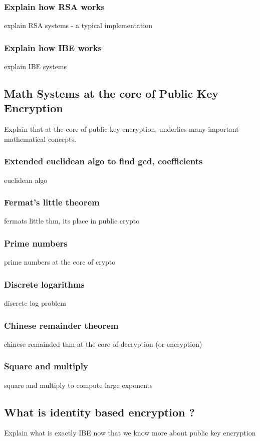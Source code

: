 \documentclass[conference]{IEEEtran}
\begin{document}
\subsubsection{Explain how RSA works}
explain RSA systems - a typical implementation

\subsubsection{Explain how IBE works}
explain IBE systems

\subsection{Math Systems at the core of Public Key Encryption}
Explain that at the core of public key encryption, underlies
many important mathematical concepts.

\subsubsection{Extended euclidean algo to find gcd, coefficients}
euclidean algo

\subsubsection{Fermat's little theorem}
fermats little thm, its place in public crypto

\subsubsection{Prime numbers}
prime numbers at the core of crypto

\subsubsection{Discrete logarithms}
discrete log problem

\subsubsection{Chinese remainder theorem}
chinese remainded thm at the core of decryption (or encryption)

\subsubsection{Square and multiply}
square and multiply to compute large exponents

\subsection{What is identity based encryption ?}
Explain what is exactly IBE now that we know more about public key encryption
\end{document}
